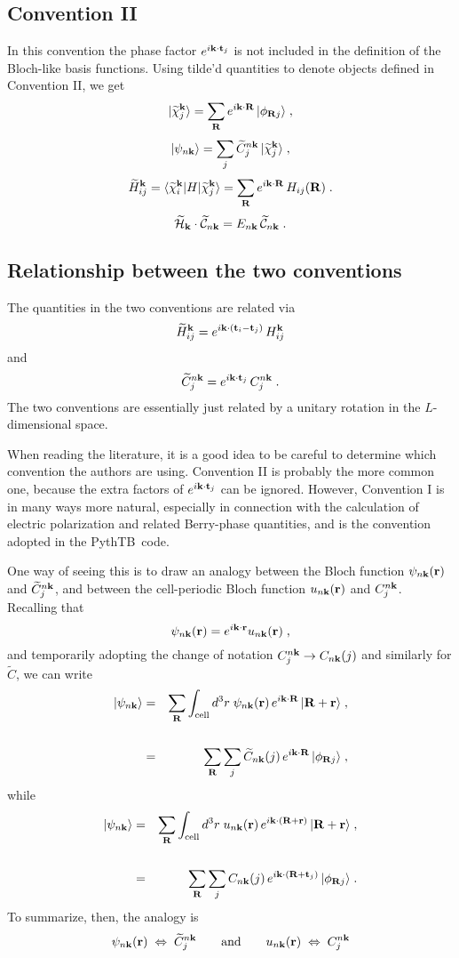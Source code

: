 \documentclass[11pt]{article}
\numberwithin{equation}{section} %
\def\nn{\nonumber\\}
\def\bea{\begin{eqnarray}}
\def\eea{\end{eqnarray}}
\def\beq{\begin{equation}}
\def\eeq{\end{equation}}
\def\PythTB{{\sc PythTB}}
\def\ket#1{\vert #1 \rangle}
\def\bra#1{\langle #1 \vert}
\def\me#1#2#3{\bra{#1}#2\ket{#3}}
\def\k{{\bf k}}
\def\r{{\bf r}}
\def\R{{\bf R}}
\def\t{{\bf t}}
\def\t{{\bf t}}
\def\Ct{{\widetilde{C}}}
\def\chit{{\widetilde{\chi}}}
\def\Ht{{\widetilde{H}}}
\def\cHt{{\widetilde{\cal H}}}
\def\cCt{{\widetilde{\cal C}}}
\begin{document}
\subsection{Convention II}

In this convention the phase factor $e^{i\k\cdot\t_j}$ is not
included in the definition of the Bloch-like basis functions.  Using
tilde'd quantities to denote objects defined in Convention II, we
get
%
\beq
\ket{\chit^\k_j}=\sum_\R e^{i\k\cdot\R}\,\ket{\phi_{\R j}} \;,
\eeq
%
\beq
\ket{\psi_{n\k}} = \sum_j \Ct_j^{n\k} \, \ket{\chit^\k_j} \;,
\eeq
%
\beq
\Ht_{ij}^\k = \me{\chit_i^\k}{H}{\chit_j^\k}
=\sum_\R e^{i\k\cdot\R}\,H_{ij}(\R) \;.
\eeq
%
\beq
\cHt_\k\cdot \cCt_{n\k} = E_{n\k}\,\cCt_{n\k} \;.
\eeq

\subsection{Relationship between the two conventions}
\label{sec:rel}

The quantities in the two conventions are related via
%
\beq
\Ht_{ij}^\k=e^{i\k\cdot(\t_i-\t_j)}\,H_{ij}^\k
\eeq
%
and
\beq
\Ct_j^{n\k}=e^{i\k\cdot\t_j}\,C_j^{n\k} \;.
\eeq
%
The two conventions are essentially just related by a unitary
rotation in the $L$-dimensional space.

When reading the literature, it is a good idea to be careful to
determine which convention the authors are using.  Convention II
is probably the more common one, because the extra factors of
$e^{i\k\cdot\t_j}$ can be ignored.  However, Convention I is in
many ways more natural, especially in connection with the calculation
of electric polarization and related Berry-phase quantities, and
is the convention adopted in the \PythTB\ code.

One way of seeing this is to draw an analogy between the
Bloch function $\psi_{n\k}(\r)$ and
$\Ct_j^{n\k}$, and between the cell-periodic Bloch function
$u_{n\k}(\r)$ and $C_j^{n\k}$.
Recalling that
%
\beq
\psi_{n\k}(\r)=e^{i\k\cdot\r}u_{n\k}(\r) \;,
\label{eq:Bloch}
\eeq
%
and temporarily adopting the change of notation $C^{n\k}_j
\rightarrow C_{n\k}(j)$ and similarly for $\Ct$, we can write
%
\bea
\ket{\psi_{n\k}}&=&\sum_\R\int_\textrm{cell} d^3r\;\psi_{n\k}(\r)\,
e^{i\k\cdot\R}\,\ket{\R+\r} \;,\nn\\
                &=&\sum_\R\sum_j \Ct_{n\k}(j)\,
e^{i\k\cdot\R}\,\ket{\phi_{\R j}} \;,
\eea
%
while
%
\bea
\ket{\psi_{n\k}}&=&\sum_\R\int_\textrm{cell} d^3r\;u_{n\k}(\r)\,
e^{i\k\cdot(\R+\r)}\,\ket{\R+\r} \;,\nn\\
                &=&\sum_\R\sum_j C_{n\k}(j)\,
e^{i\k\cdot(\R+\t_j)}\,\ket{\phi_{\R j}} \;.
\eea
%
To summarize, then, the analogy is
%
\[
\psi_{n\k}(\r)\;\Leftrightarrow\;\Ct^{n\k}_j
\qquad\textrm{and}\qquad
u_{n\k}(\r)\;\Leftrightarrow\;C^{n\k}_j
\]
\end{document}
